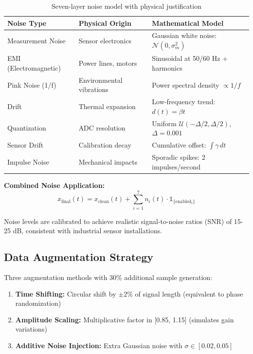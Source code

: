 \documentclass[11pt,a4paper]{article}
\begin{document}
\begin{table}[h]
\centering
\small
\begin{tabular}{@{}p{3.5cm}p{4cm}p{4.5cm}@{}}
\toprule
\textbf{Noise Type} & \textbf{Physical Origin} & \textbf{Mathematical Model} \\
\midrule
Measurement Noise & Sensor electronics & Gaussian white noise: $\mathcal{N}(0, \sigma^2_m)$ \\
EMI (Electromagnetic) & Power lines, motors & Sinusoidal at 50/60 Hz + harmonics \\
Pink Noise (1/f) & Environmental vibrations & Power spectral density $\propto 1/f$ \\
Drift & Thermal expansion & Low-frequency trend: $d(t) = \beta t$ \\
Quantization & ADC resolution & Uniform $\mathcal{U}(-\Delta/2, \Delta/2)$, $\Delta = 0.001$ \\
Sensor Drift & Calibration decay & Cumulative offset: $\int \gamma \, dt$ \\
Impulse Noise & Mechanical impacts & Sporadic spikes: 2 impulses/second \\
\bottomrule
\end{tabular}
\caption{Seven-layer noise model with physical justification}
\end{table}

\textbf{Combined Noise Application:}
\begin{equation}
x_{\text{final}}(t) = x_{\text{clean}}(t) + \sum_{i=1}^{7} n_i(t) \cdot \mathbb{1}_{\{\text{enabled}_i\}}
\end{equation}

Noise levels are calibrated to achieve realistic signal-to-noise ratios (SNR) of 15-25 dB, consistent with industrial sensor installations.

\subsection{Data Augmentation Strategy}

Three augmentation methods with 30\% additional sample generation:

\begin{enumerate}[leftmargin=*, itemsep=0.3em]
    \item \textbf{Time Shifting:} Circular shift by $\pm 2\%$ of signal length (equivalent to phase randomization)
    \item \textbf{Amplitude Scaling:} Multiplicative factor in [0.85, 1.15] (simulates gain variations)
    \item \textbf{Additive Noise Injection:} Extra Gaussian noise with $\sigma \in [0.02, 0.05]$
\end{enumerate}
\end{document}
